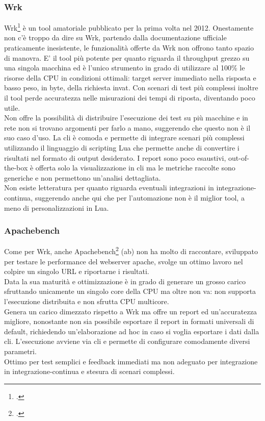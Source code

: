 \subsubsection{Wrk}
Wrk\footcite{site:wrk} è un tool amatoriale pubblicato per la prima volta nel 2012.
Onestamente non c’è troppo da dire su Wrk, partendo dalla documentazione ufficiale praticamente inesistente, le funzionalità offerte da Wrk non offrono tanto spazio di manovra.
E’ il tool più potente per quanto riguarda il throughput grezzo su una singola macchina ed è l’unico strumento in grado di utilizzare al 100\% le risorse della CPU in condizioni ottimali: target server immediato nella risposta e basso peso, in byte, della richiesta invat. Con scenari di test più complessi inoltre il tool perde accuratezza nelle misurazioni dei tempi di riposta, diventando poco utile. \\
Non offre la possibilità di distribuire l’esecuzione dei test su più macchine e in rete non si trovano argomenti per farlo a mano, suggerendo che questo non è il suo caso d'uso.
La \gls{cli} è comoda e permette di integrare scenari più complessi utilizzando il linguaggio di scripting Lua che permette anche di convertire i risultati nel formato di output desiderato.
I report sono poco esaustivi, \gls{out-of-the-box} è offerta solo la visualizzazione in \gls{cli} ma le metriche raccolte sono generiche e non permettono un’analisi dettagliata.\\
Non esiste letteratura per quanto riguarda eventuali integrazioni in \gls{integrazione-continua}, suggerendo anche qui che per l’automazione non è il miglior tool, a meno di personalizzazioni in Lua.
\subsubsection{Apachebench}
Come per Wrk, anche Apachebench\footcite{site:ab} (ab) non ha molto di raccontare, sviluppato per testare le performance del webserver apache, svolge un ottimo lavoro nel colpire un singolo URL e riportarne i risultati.\\
Data la sua maturità e ottimizzazione è in grado di generare un grosso carico sfruttando unicamente un singolo core della CPU ma oltre non va: non supporta l’esecuzione distribuita e non sfrutta CPU multicore. \\
Genera un carico dimezzato rispetto a Wrk ma offre un report ed un’accuratezza migliore, nonostante non sia possibile esportare il report in formati universali di default, richiedendo un'elaborazione ad hoc in caso si voglia esportare i dati dalla \gls{cli}.
L'esecuzione avviene via \gls{cli} e permette di configurare comodamente diversi parametri.\\
Ottimo per test semplici e feedback immediati ma non adeguato per integrazione in \gls{integrazione-continua} e stesura di scenari complessi.
